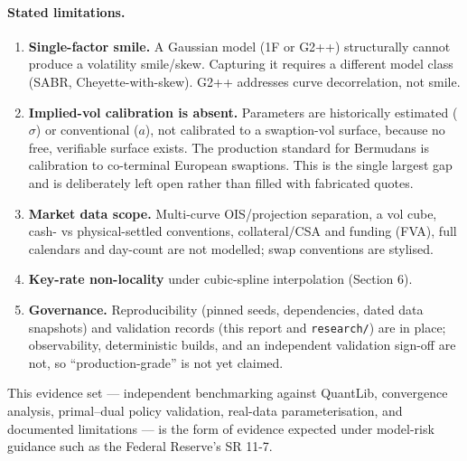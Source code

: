 \documentclass[11pt]{article}
\begin{document}
\paragraph{Stated limitations.}
\begin{enumerate}[nosep]
  \item \textbf{Single-factor smile.} A Gaussian model (1F or G2++) structurally cannot
        produce a volatility smile/skew. Capturing it requires a different model class
        (SABR, Cheyette-with-skew). G2++ addresses curve decorrelation, not smile.
  \item \textbf{Implied-vol calibration is absent.} Parameters are historically estimated
        ($\sigma$) or conventional ($a$), not calibrated to a swaption-vol surface,
        because no free, verifiable surface exists. The production standard for Bermudans
        is calibration to co-terminal European swaptions. This is the single largest gap
        and is deliberately left open rather than filled with fabricated quotes.
  \item \textbf{Market data scope.} Multi-curve OIS/projection separation, a vol cube,
        cash- vs physical-settled conventions, collateral/CSA and funding (FVA), full
        calendars and day-count are not modelled; swap conventions are stylised.
  \item \textbf{Key-rate non-locality} under cubic-spline interpolation (Section 6).
  \item \textbf{Governance.} Reproducibility (pinned seeds, dependencies, dated data
        snapshots) and validation records (this report and \texttt{research/}) are in
        place; observability, deterministic builds, and an independent validation
        sign-off are not, so ``production-grade'' is not yet claimed.
\end{enumerate}

\noindent This evidence set --- independent benchmarking against QuantLib, convergence
analysis, primal--dual policy validation, real-data parameterisation, and documented
limitations --- is the form of evidence expected under model-risk guidance such as the
Federal Reserve's SR 11-7.
\end{document}
